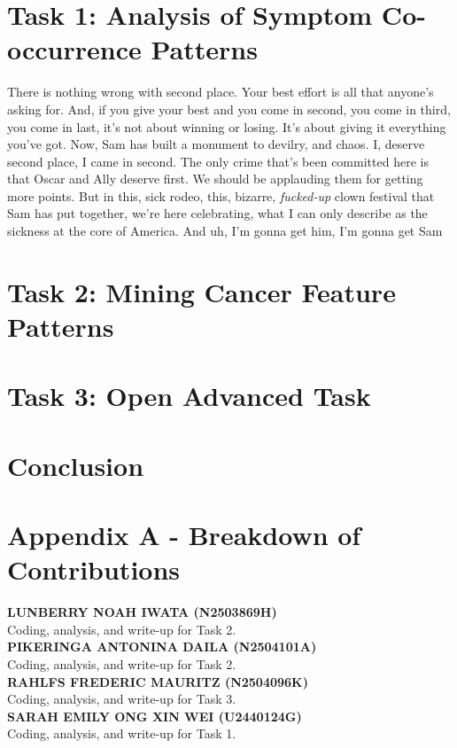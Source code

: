 \documentclass[12pt]{article}
\begin{document}
\tableofcontents

\pagebreak
{}
\section{Task 1: Analysis of Symptom Co-occurrence Patterns}
There is nothing wrong with second place. 
Your best effort is all that anyone's asking for. 
And, if you give your best and you come in second, you come in third, you come in last, it's not about winning or losing. 
It's about giving it everything you've got. Now, Sam has built a monument to devilry, and chaos. 
I, deserve second place, I came in second. The only crime that’s been committed here is that Oscar and Ally deserve first. 
We should be applauding them for getting more points. But in this, sick rodeo, this, bizarre, \textit{fucked-up} clown festival that Sam has put together, we’re here celebrating, what I can only describe as the sickness at the core of America. 
And uh, I’m gonna get him, I’m gonna get Sam

\pagebreak
\section{Task 2: Mining Cancer Feature Patterns}

\pagebreak
\section{Task 3: Open Advanced Task}

\pagebreak
\section{Conclusion} %

\pagebreak
\section*{Appendix A - Breakdown of Contributions}
\renewcommand{\thepage}{A-\arabic{page}}

\textbf{LUNBERRY NOAH IWATA (N2503869H)} \\
Coding, analysis, and write-up for Task 2. \\

\textbf{PIKERINGA ANTONINA DAILA (N2504101A)} \\
Coding, analysis, and write-up for Task 2. \\

\textbf{RAHLFS FREDERIC MAURITZ (N2504096K)} \\
Coding, analysis, and write-up for Task 3. \\

\textbf{SARAH EMILY ONG XIN WEI (U2440124G)} \\
Coding, analysis, and write-up for Task 1. \\
\end{document}
